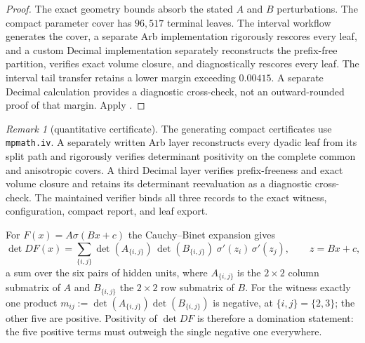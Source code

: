 \documentclass[11pt,twoside,leqno]{article}
\theoremstyle{plain}
\theoremstyle{definition}
\theoremstyle{remark}
\newtheorem{remark}[remark]{Remark}
\begin{document}
\begin{proof}
The exact geometry bounds absorb the stated $A$ and $B$ perturbations. The compact parameter cover has $96{,}517$ terminal leaves. The  interval workflow generates the cover, a separate Arb implementation rigorously rescores every leaf, and a custom Decimal implementation separately reconstructs the prefix-free partition, verifies exact volume closure, and diagnostically rescores every leaf. The interval tail transfer retains a lower margin exceeding $0.00415$. A separate Decimal calculation provides a diagnostic cross-check, not an outward-rounded proof of that margin. Apply .
\end{proof}

\begin{remark}[quantitative certificate]
The generating compact certificates use \texttt{mpmath.iv}. A separately written Arb layer reconstructs every dyadic leaf from its split path and rigorously verifies determinant positivity on the complete common and anisotropic covers. A third Decimal layer verifies prefix-freeness and exact volume closure and retains its determinant reevaluation as a diagnostic cross-check. The maintained verifier binds all three records to the exact witness, configuration, compact report, and leaf export.
\end{remark}

For $F(x)=A\sigma(Bx+c)$ the Cauchy--Binet expansion gives
\[
\det DF(x)=\sum_{\{i,j\}}\det(A_{\{i,j\}})\,\det(B_{\{i,j\}})\;
\sigma'(z_i)\,\sigma'(z_j),\qquad z=Bx+c,
\]
a sum over the six pairs of hidden units, where $A_{\{i,j\}}$ is the $2\times2$ column submatrix of $A$ and $B_{\{i,j\}}$ the $2\times2$ row submatrix of $B$. For the witness exactly one product $m_{ij}:=\det(A_{\{i,j\}})\det(B_{\{i,j\}})$ is negative, at $\{i,j\}=\{2,3\}$; the other five are positive. Positivity of $\det DF$ is therefore a domination statement: the five positive terms must outweigh the single negative one everywhere.
\end{document}
